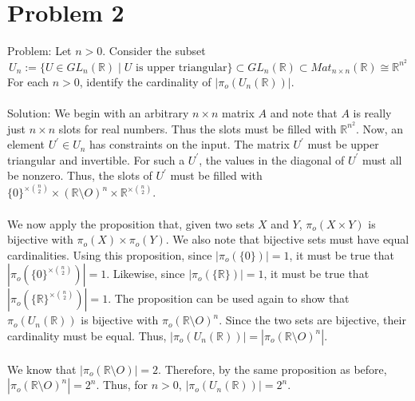 \documentclass{article}
\begin{document}
\section*{Problem 2}
Problem: Let $n > 0$. Consider the subset
$$U_n := \{ U \in GL_n(\mathbb{R}) \mid U \text{ is upper triangular} \} \subset GL_n(\mathbb{R}) \subset Mat_{n \times n}(\mathbb{R}) \cong \mathbb{R}^{n^2}$$
For each $n > 0$, identify the cardinality of $| \pi_o (U_n(\mathbb{R})) |$. \\\\
Solution: We begin with an arbitrary $n \times n$ matrix $A$ and note that $A$ is really just $n \times n$ slots for real numbers. Thus the slots must be filled with $\mathbb{R}^{n^2}$.
Now, an element $U^ \prime \in U_n$ has constraints on the input.
The matrix $U^\prime$ must be upper triangular and invertible. For such a $U^\prime$, the values in the diagonal of $U^\prime$ must all be nonzero. Thus, the slots of $U^\prime$ must be filled with
$ \{ 0 \}^{\times {n \choose 2}} \times (\mathbb{R} \setminus O)^n \times \mathbb{R}^{\times {n \choose 2}}$. \\\\
We now apply the proposition that, given two sets $X$ and $Y$,
$\pi_o (X \times Y)$ is bijective with $\pi_o (X) \times \pi_o (Y)$.
We also note that bijective sets must have equal cardinalities.
Using this proposition, since $|\pi_o (\{ 0 \})| = 1$, it must be true that $|\pi_o (\{ 0 \} ^ {\times {n \choose 2}})| = 1$.
Likewise, since $|\pi_o (\{ \mathbb{R} \})| = 1$, it must be true that $|\pi_o (\{ \mathbb{R} \} ^ {\times {n \choose 2}})| = 1$.
The proposition can be used again to show that
$ \pi_o (U_n(\mathbb{R})) $
is bijective with
$ \pi_o (\mathbb{R} \setminus O)^n $.
Since the two sets are bijective, their cardinality must be equal. Thus,
$| \pi_o (U_n(\mathbb{R})) | = | \pi_o (\mathbb{R} \setminus O)^n | $. \\\\
We know that $ | \pi_o (\mathbb{R} \setminus O) | = 2$. Therefore, by the same proposition as before, $ | \pi_o (\mathbb{R} \setminus O)^n | = 2^n$.
Thus, for $n > 0$, $| \pi_o (U_n(\mathbb{R})) | = 2^n$.

\newpage
\end{document}
